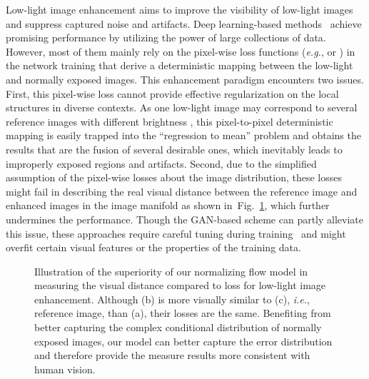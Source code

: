 \documentclass[letterpaper]{article} \usepackage{aaai22}  \usepackage{times}  \usepackage{helvet}  \usepackage{courier}  \usepackage[hyphens]{url}  \usepackage{graphicx} \urlstyle{rm} \def\UrlFont{\rm}  \usepackage{natbib}  \usepackage{caption} \usepackage{subfigure}
\newcommand{\Fref}[1]{Fig.~\ref{#1}}
\def\ie{\emph{i.e.}}
\def\eg{\emph{e.g.}}
\def\eg{{\emph{e.g.}}}
\def\ie{{\emph{i.e.}}}
\newcommand{\yufei}[1]{{#1}}
\newcommand{\wh}[1]{{#1}}
\begin{document}
Low-light image enhancement aims to improve the visibility of low-light images and suppress captured noise and artifacts.
Deep learning-based methods~\cite{zhang2019kindling, zamir2020learning,chen2018learning} achieve promising performance by utilizing the power of large collections of data.
However, most of them mainly rely on the pixel-wise loss functions (\eg,  or ) in the network training that derive a deterministic mapping between the low-light and normally exposed images.
This enhancement paradigm encounters two issues.
First, this pixel-wise loss cannot provide effective regularization on the local structures in diverse contexts.
\yufei{As one low-light image may correspond to several reference images with different brightness \cite{zhang2021beyond}}, 
this pixel-to-pixel deterministic mapping is easily trapped into the ``regression to mean'' problem and obtains the results that are the fusion of several desirable ones, which inevitably leads to improperly exposed regions and artifacts.
Second, due to the simplified assumption of the pixel-wise losses about the image distribution, these losses might fail in describing the real visual distance between the reference image and enhanced images in the image manifold \yufei{as shown in~\Fref{fig:cond-prob}},
which further undermines the performance.
Though the \yufei{GAN-based} scheme can partly alleviate this issue, these approaches require careful tuning during training~\cite{wolf2021deflow} and might overfit certain visual features or the properties of the training data.





\begin{figure}[t]
    \caption{
    \yufei{
    \wh{
    Illustration of the superiority of our normalizing flow model in measuring the visual distance compared to  loss for low-light image enhancement.
Although (b) is more visually similar to (c), \ie, reference image, than (a), their  losses are the same.
Benefiting from better capturing the complex conditional distribution of normally exposed images, our model can better capture the error distribution and therefore provide the measure results more consistent with human vision.
    }
}
    }
\label{fig:cond-prob}
\end{figure}
\end{document}
